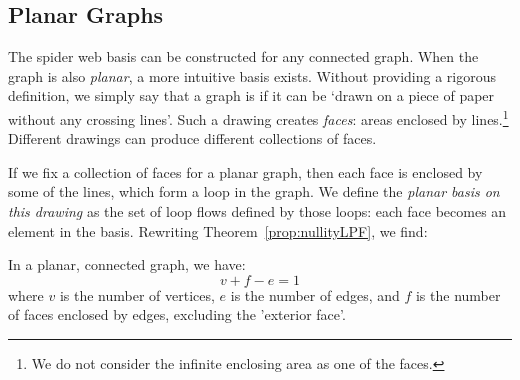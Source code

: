 \documentclass[main.tex]{subfiles}
\begin{document}
\subsection{Planar Graphs}
The spider web basis can be constructed for any connected graph. When the graph is also \emph{planar}, a more intuitive basis exists. Without providing a rigorous definition, we simply say that a graph is  if it can be `drawn on a piece of paper without any crossing lines'. Such a drawing creates \emph{faces}: areas enclosed by lines.\footnote{We do not consider the infinite enclosing area as one of the faces.} Different drawings can produce different collections of faces.

If we fix a collection of faces for a planar graph, then each face is enclosed by some of the lines, which form a loop in the graph. We define the \emph{planar basis on this drawing} as the set of loop flows defined by those loops: each face becomes an element in the basis. Rewriting Theorem~\ref{prop:nullityLPF}, we find:
%
%
%

\begin{corollary}
In a planar, connected graph, we have:
$$v + f - e = 1$$
where $v$ is the number of vertices, $e$ is the number of edges, and $f$ is the number of faces enclosed by edges, excluding the 'exterior face'.
\end{corollary}
\end{document}
